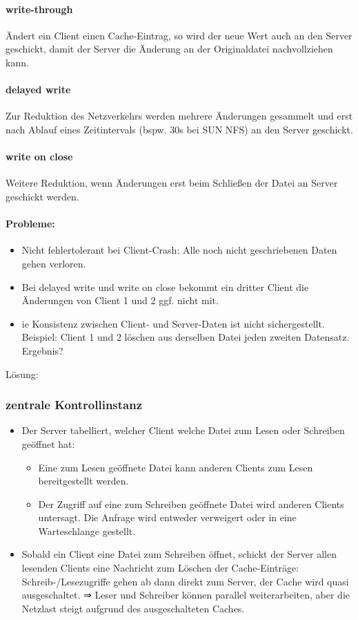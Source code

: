 \documentclass[a4paper]{article}
\begin{document}
		\paragraph{write-through}Ändert ein Client einen Cache-Eintrag, so wird der neue Wert auch an den Server geschickt, damit der Server die Änderung an der Originaldatei nachvollziehen kann.
	\paragraph{delayed write}Zur Reduktion des Netzverkehrs werden mehrere Änderungen gesammelt und erst nach Ablauf eines Zeitintervals (bspw. 30s bei SUN NFS) an den Server geschickt.
	\paragraph{write on close}Weitere Reduktion, wenn Änderungen erst beim Schließen der Datei an Server geschickt werden.
	\paragraph{Probleme:}
		\begin{itemize}
			\item Nicht fehlertolerant bei Client-Crash: Alle noch nicht geschriebenen Daten gehen verloren.
			\item Bei delayed write und write on close bekommt ein dritter Client die Änderungen von Client 1 und 2 ggf. nicht mit.
			\item ie Konsistenz zwischen Client- und Server-Daten ist nicht sichergestellt. Beispiel: Client 1 und 2 löschen aus derselben Datei jeden zweiten Datensatz. Ergebnis?
		\end{itemize}
		Lösung:
		\subsubsection{zentrale Kontrollinstanz}
			\begin{itemize}
				\item Der Server tabelliert, welcher Client welche Datei zum Lesen oder Schreiben geöffnet hat:
				\begin{itemize}
					\item Eine zum Lesen geöffnete Datei kann anderen Clients zum Lesen bereitgestellt werden.
					\item Der Zugriff auf eine zum Schreiben geöffnete Datei wird anderen Clients untersagt. Die Anfrage wird entweder verweigert oder in eine Warteschlange gestellt.
				\end{itemize}
				\item Sobald ein Client eine Datei zum Schreiben öffnet, schickt der Server allen lesenden Clients eine Nachricht zum Löschen der Cache-Einträge: Schreib-/Lesezugriffe gehen ab dann direkt zum Server, der Cache wird quasi ausgeschaltet. ⇒ Leser und Schreiber können parallel weiterarbeiten, aber die Netzlast steigt aufgrund des ausgeschalteten Caches.
			\end{itemize}
\end{document}
